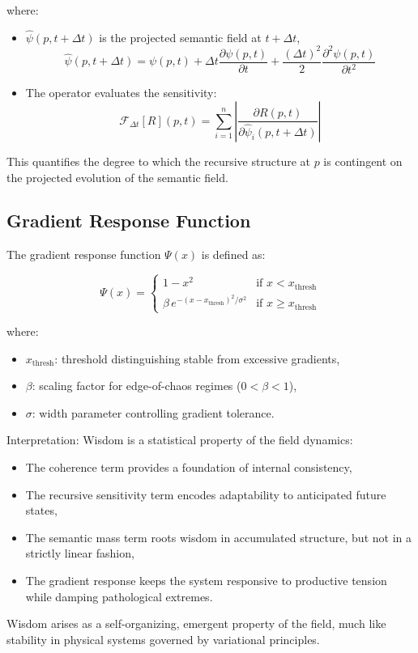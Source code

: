 where:
\begin{itemize}
    \item \(\hat{\psi}(p, t+\Delta t)\) is the projected semantic field at \(t+\Delta t\),
    \begin{equation}
    \hat{\psi}(p, t+\Delta t) = \psi(p, t) + \Delta t \frac{\partial \psi(p, t)}{\partial t} + \frac{(\Delta t)^2}{2} \frac{\partial^2 \psi(p, t)}{\partial t^2}
    \end{equation}
    \item The operator evaluates the sensitivity:
    \begin{equation}
    \mathcal{F}_{\Delta t}[R](p, t) = \sum_{i=1}^n \left| \frac{\partial R(p, t)}{\partial \hat{\psi}_i(p, t+\Delta t)} \right|
    \end{equation}
\end{itemize}
This quantifies the degree to which the recursive structure at \(p\) is contingent on the projected evolution of the semantic field.

\subsection{Gradient Response Function}

The gradient response function \(\Psi(x)\) is defined as:

\begin{equation}
\Psi(x) =
\begin{cases}
1 - x^2 & \text{if } x < x_{\text{thresh}} \\
\beta \, e^{-(x - x_{\text{thresh}})^2 / \sigma^2} & \text{if } x \geq x_{\text{thresh}}
\end{cases}
\end{equation}

where:
\begin{itemize}
    \item \(x_{\text{thresh}}\): threshold distinguishing stable from excessive gradients,
    \item \(\beta\): scaling factor for edge-of-chaos regimes (\(0 < \beta < 1\)),
    \item \(\sigma\): width parameter controlling gradient tolerance.
\end{itemize}

Interpretation:
Wisdom is a statistical property of the field dynamics:
\begin{itemize}
    \item The coherence term provides a foundation of internal consistency,
    \item The recursive sensitivity term encodes adaptability to anticipated future states,
    \item The semantic mass term roots wisdom in accumulated structure, but not in a strictly linear fashion,
    \item The gradient response keeps the system responsive to productive tension while damping pathological extremes.
\end{itemize}
Wisdom arises as a self-organizing, emergent property of the field, much like stability in physical systems governed by variational principles.

